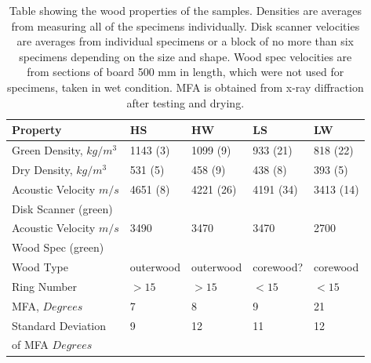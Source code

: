 \documentclass[10pt]{article}
\begin{document}
\begin{table}
\caption[Wood properties]{Table showing the wood properties of the samples. Densities are averages from measuring all of the specimens individually. Disk scanner velocities are averages from individual specimens or a block of no more than six specimens depending on the size and shape. Wood spec velocities are from sections of board  500 mm in length, which were not used for specimens, taken in wet condition. MFA is obtained from x-ray diffraction after testing and drying. }
\label{table:init properties}
\begin{tabular}{l l l l l}
\hline
Property & HS & HW & LS & LW\\
\hline
Green Density, \(kg/m^3\) & 1143 (3) & 1099 (9) & 933 (21) & 818 (22) \\
Dry Density,  \(kg/m^3\) & 531 (5)& 458 (9) & 438 (8) & 393 (5)\\
Acoustic Velocity \(m/s\) & 4651 (8) & 4221 (26)& 4191 (34)& 3413 (14)\\
Disk Scanner (green)      &          &          &          &           \\
Acoustic Velocity  \(m/s\) & 3490 & 3470 & 3470 & 2700\\
Wood Spec (green)          &      &      &      &      \\
Wood Type & outerwood & outerwood & corewood? & corewood \\
Ring Number & \(>15\) & \(>15\)&\(<15\) & \(<15\)  \\
MFA, \(Degrees\) & 7 & 8 & 9 & 21  \\
Standard Deviation & 9 & 12 & 11 & 12 \\
of MFA \(Degrees\)&   &  &   &   \\
\hline
\end{tabular}
\end{table}
\end{document}

